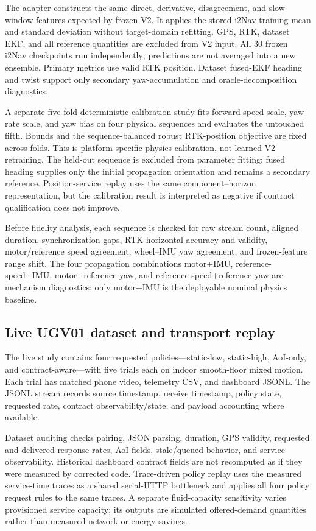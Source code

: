 \documentclass[journal,onecolumn]{IEEEtran}
\begin{document}
The adapter constructs the same direct, derivative, disagreement, and slow-window features expected by frozen V2. It applies the stored i2Nav training mean and standard deviation without target-domain refitting. GPS, RTK, dataset EKF, and all reference quantities are excluded from V2 input. All 30 frozen i2Nav checkpoints run independently; predictions are not averaged into a new ensemble. Primary metrics use valid RTK position. Dataset fused-EKF heading and twist support only secondary yaw-accumulation and oracle-decomposition diagnostics.

A separate five-fold deterministic calibration study fits forward-speed scale, yaw-rate scale, and yaw bias on four physical sequences and evaluates the untouched fifth. Bounds and the sequence-balanced robust RTK-position objective are fixed across folds. This is platform-specific physics calibration, not learned-V2 retraining. The held-out sequence is excluded from parameter fitting; fused heading supplies only the initial propagation orientation and remains a secondary reference. Position-service replay uses the same component--horizon representation, but the calibration result is interpreted as negative if contract qualification does not improve.

Before fidelity analysis, each sequence is checked for raw stream count, aligned duration, synchronization gaps, RTK horizontal accuracy and validity, motor/reference speed agreement, wheel--IMU yaw agreement, and frozen-feature range shift. The four propagation combinations motor+IMU, reference-speed+IMU, motor+reference-yaw, and reference-speed+reference-yaw are mechanism diagnostics; only motor+IMU is the deployable nominal physics baseline.

\subsection{Live UGV01 dataset and transport replay}
The live study contains four requested policies---static-low, static-high, AoI-only, and contract-aware---with five trials each on indoor smooth-floor mixed motion. Each trial has matched phone video, telemetry CSV, and dashboard JSONL. The JSONL stream records source timestamp, receive timestamp, policy state, requested rate, contract observability/state, and payload accounting where available.

Dataset auditing checks pairing, JSON parsing, duration, GPS validity, requested and delivered response rates, AoI fields, stale/queued behavior, and service observability. Historical dashboard contract fields are not recomputed as if they were measured by corrected code. Trace-driven policy replay uses the measured service-time traces as a shared serial-HTTP bottleneck and applies all four policy request rules to the same traces. A separate fluid-capacity sensitivity varies provisioned service capacity; its outputs are simulated offered-demand quantities rather than measured network or energy savings.
\end{document}
